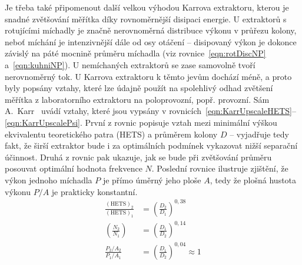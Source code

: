 Je třeba také připomenout další velkou výhodou Karrova extraktoru, kterou je snadné zvětšování měřítka díky rovnoměrnější disipaci energie.
U extraktorů s rotujícími míchadly je značně nerovnoměrná distribuce výkonu v průřezu kolony, neboť míchání je intenzivnější dále od osy otáčení -- disipovaný výkon je dokonce závislý na páté mocnině průměru míchadla (viz rovnice~\ref{eqn:rotDiscNP} a~\ref{eqn:kuhniNP}).
U nemíchaných extraktorů se zase samovolně tvoří nerovnoměrný tok.
U Karrova extraktoru k těmto jevům dochází méně, a proto byly popsány vztahy, které lze údajně použít na spolehlivý odhad zvětšení měřítka z laboratorního extraktoru na poloprovozní, popř. provozní.
Sám A.~Karr~\cite{Karr1985} uvádí vztahy, které jsou vypsány v rovnicích~\ref{eqn:KarrUpscaleHETS}--\ref{eqn:KarrUpscalePsi}.
První z rovnic popisuje vztah mezi minimální výškou ekvivalentu teoretického patra (HETS) a průměrem kolony $D$ -- vyjadřuje tedy fakt, že širší extraktor bude i za optimálních podmínek vykazovat nižší separační účinnost.
Druhá z rovnic pak ukazuje, jak se bude při zvětšování průměru posouvat optimální hodnota frekvence $N$.
Poslední rovnice ilustruje zjištění, že výkon jednoho míchadla $P$ je přímo úměrný jeho ploše $A$, tedy že plošná hustota výkonu $P/A$ je prakticky konstantní.
\begin{align}
\label{eqn:KarrUpscaleHETS}
	\frac{(\mathrm{HETS})_2}{(\mathrm{HETS})_1} &= \left( \frac{D_2}{D_1} \right)^{0,38} \\
\label{eqn:KarrUpscaleN}
	\left( \frac{N_2}{N_1} \right) &= \left( \frac{D_1}{D_2} \right)^{0,14} \\
\label{eqn:KarrUpscalePsi}
	\frac{P_2 / A_2}{P_1 / A_1} &= \left( \frac{D_1}{D_2} \right)^{0,04} \approx 1
\end{align}

